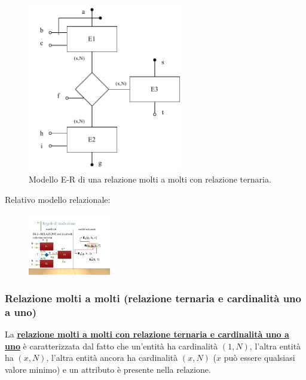 \documentclass[a4paper]{article}
\begin{document}
	\begin{figure}[!htp]
		\centering
		\includegraphics[width=0.6\textwidth]{img/relazionale_molti_a_molti_rel_ternaria.pdf}
		\caption{Modello E-R di una relazione molti a molti con relazione ternaria.}
	\end{figure}
	
	\noindent
	Relativo modello relazionale:
	
	\begin{figure}[!htp]
		\centering
		\includegraphics[width=0.32\textwidth]{img/relazionale_molti_a_molti_rel_ternaria2.pdf}
	\end{figure}

	\newpage
	
	\subsubsection{Relazione molti a molti (relazione ternaria e cardinalità uno a uno)}
	
	La \textcolor{Red3}{\textbf{\underline{relazione molti a molti con relazione ternaria e cardinalità uno a uno}}} è caratterizzata dal fatto che un'entità ha cardinalità $\left(1,N\right)$, l'altra entità ha $\left(x,N\right)$, l'altra entità ancora ha cardinalità $\left(x,N\right)$ ($x$ può essere qualsiasi valore minimo) e un attributo è presente nella relazione.
	
\end{document}
